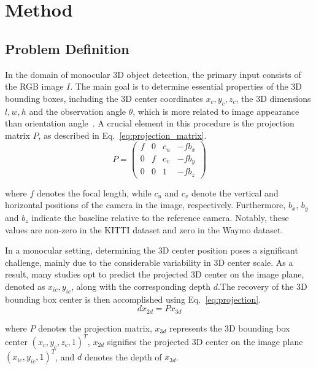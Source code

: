 \documentclass[journal]{IEEEtran}
\begin{document}
	\section{Method}\label{sec:method}
	\subsection{Problem Definition}
	In the domain of monocular 3D object detection, the primary input consists of the RGB image $I$. The main goal is to determine essential properties of the 3D bounding boxes, including the 3D center coordinates $x_c, y_c, z_c$, the 3D dimensions $l, w, h$ and the observation angle $\theta$, which is more related to image appearance than orientation angle~\cite{geometry3d}. A crucial element in this procedure is the projection matrix $P$, as described in Eq.~\eqref{eq:projection_matrix}.
	\begin{equation}
		P=\begin{pmatrix}f&0&c_u&-fb_x\\0&f&c_v&-fb_y\\0&0&1&-fb_z\end{pmatrix}
		\label{eq:projection_matrix}
	\end{equation}

	where $f$ denotes the focal length, while $c_u$ and $c_v$ denote the vertical and horizontal positions of the camera in the image, respectively. Furthermore, $b_x$, $b_y$ and $b_z$ indicate the baseline relative to the reference camera. Notably, these values are non-zero in the KITTI dataset and zero in the Waymo dataset.
	
	In a monocular setting, determining the 3D center position poses a significant challenge, mainly due to the considerable variability in 3D center scale. As a result, many studies opt to predict the projected 3D center on the image plane, denoted as $x_{ic}, y_{ic}$, along with the corresponding depth $d$.The recovery of the 3D bounding box center is then accomplished using Eq.~\eqref{eq:projection}.
	\begin{equation}
		dx_{2d} = Px_{3d}
		\label{eq:projection}
	\end{equation}

	where $P$ denotes the projection matrix, $x_{3d}$ represents the 3D bounding box center $(x_c, y_c, z_c, 1)^T$, $x_{2d}$ signifies the projected 3D center on the image plane $(x_{ic}, y_{ic}, 1)^T$, and $d$ denotes the depth of $x_{3d}$.
	
\end{document}
